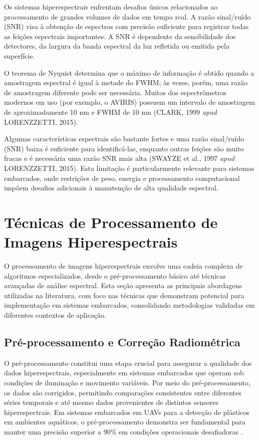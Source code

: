 Os sistemas hiperespectrais enfrentam desafios únicos relacionados ao 
processamento de grandes volumes de dados em tempo real. A razão 
sinal/ruído (SNR) visa à obtenção de espectros com precisão suficiente 
para registrar todas as feições espectrais importantes. A SNR é dependente 
da sensibilidade dos detectores, da largura da banda espectral da luz 
refletida ou emitida pela superfície.

O teorema de Nyquist determina que o máximo de informação é obtido
quando a amostragem espectral é igual à metade do FWHM; às vezes, porém,
uma razão de amostragem diferente pode ser necessária. Muitos dos espectrômetros modernos em 
uso (por exemplo, o AVIRIS) possuem um intervalo de amostragem de 
aproximadamente 10 nm e FWHM de 10 nm (CLARK, 1999 \textit{apud} 
LORENZZETTI, 2015).

Algumas características espectrais são bastante fortes e uma razão
sinal/ruído (SNR) baixa é suficiente para identificá-las, enquanto outras
feições são muito fracas e é necessária uma razão SNR mais alta (SWAYZE
et al., 1997 \textit{apud} LORENZZETTI, 2015). Esta limitação é particularmente relevante para sistemas
embarcados, onde restrições de peso, energia e processamento computacional
impõem desafios adicionais à manutenção de alta qualidade espectral.

\section{Técnicas de Processamento de Imagens Hiperespectrais}
\label{sec:tecnicas_processamento_hiperespectral}

O processamento de imagens hiperespectrais envolve uma cadeia complexa de 
algoritmos especializados, desde o pré-processamento básico até técnicas 
avançadas de análise espectral. Esta seção apresenta as principais abordagens 
utilizadas na literatura, com foco nas técnicas que demonstram potencial para 
implementação em sistemas embarcados, consolidando metodologias validadas em 
diferentes contextos de aplicação.

\subsection{Pré-processamento e Correção Radiométrica}
\label{subsec:pre_processamento}

O pré-processamento constitui uma etapa crucial para assegurar a
qualidade dos dados hiperespectrais, especialmente em sistemas embarcados
que operam sob condições de iluminação e movimento variáveis. Por meio do
pré-processamento, os dados são corrigidos, permitindo comparações
consistentes entre diferentes séries temporais e até mesmo dados
provenientes de distintos sensores hiperespectrais. Em sistemas embarcados
em UAVs para a detecção de plásticos em ambientes aquáticos, o
pré-processamento demonstra ser fundamental para manter uma precisão
superior a 90\% em condições operacionais desafiadoras \cite{Alboody2023}.

